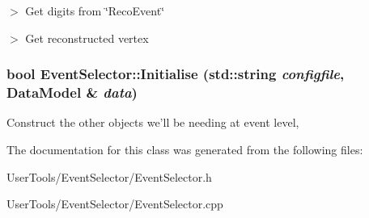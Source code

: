 $>$ Get digits from \char`\"{}RecoEvent\char`\"{}

$>$ Get reconstructed vertex \hypertarget{classEventSelector_a839f44332021b0345d0277f68ae612a8}{
\subsubsection[{Initialise}]{\setlength{\rightskip}{0pt plus 5cm}bool EventSelector::Initialise (std::string {\em configfile}, \/  {\bf DataModel} \& {\em data})}}
\label{classEventSelector_a839f44332021b0345d0277f68ae612a8}


Construct the other objects we'll be needing at event level, 

The documentation for this class was generated from the following files:\begin{DoxyCompactItemize}
\item 
UserTools/EventSelector/EventSelector.h\item 
UserTools/EventSelector/EventSelector.cpp\end{DoxyCompactItemize}
